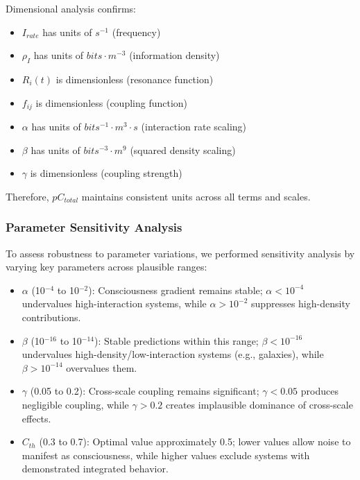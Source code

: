 \documentclass[12pt]{article}
\begin{document}
Dimensional analysis confirms:
\begin{itemize}
    \item $I_{rate}$ has units of $s^{-1}$ (frequency)
    \item $ρ_I$ has units of $bits \cdot m^{-3}$ (information density)
    \item $R_i(t)$ is dimensionless (resonance function)
    \item $f_{ij}$ is dimensionless (coupling function)
    \item $α$ has units of $bits^{-1} \cdot m^3 \cdot s$ (interaction rate scaling)
    \item $β$ has units of $bits^{-3} \cdot m^9$ (squared density scaling)
    \item $γ$ is dimensionless (coupling strength)
\end{itemize}

Therefore, $pC_{total}$ maintains consistent units across all terms and scales.

\subsubsection{Parameter Sensitivity Analysis}

To assess robustness to parameter variations, we performed sensitivity analysis by varying key parameters across plausible ranges:

\begin{itemize}
    \item $α$ (10$^{-4}$ to 10$^{-2}$): Consciousness gradient remains stable; $α < 10^{-4}$ undervalues high-interaction systems, while $α > 10^{-2}$ suppresses high-density contributions.
    
    \item $β$ (10$^{-16}$ to 10$^{-14}$): Stable predictions within this range; $β < 10^{-16}$ undervalues high-density/low-interaction systems (e.g., galaxies), while $β > 10^{-14}$ overvalues them.
    
    \item $γ$ (0.05 to 0.2): Cross-scale coupling remains significant; $γ < 0.05$ produces negligible coupling, while $γ > 0.2$ creates implausible dominance of cross-scale effects.
    
    \item $C_{th}$ (0.3 to 0.7): Optimal value approximately 0.5; lower values allow noise to manifest as consciousness, while higher values exclude systems with demonstrated integrated behavior.
\end{itemize}
\end{document}
